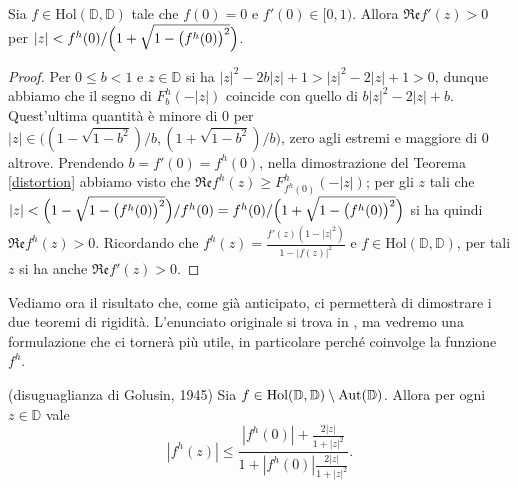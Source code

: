 \begin{cor} \label{distorto}
  Sia $f \in \text{Hol}(\mathbb{D},\mathbb{D})$ tale che $f(0)=0$ e $f'(0) \in [0,1)$. Allora $\mathfrak{Re}f'(z)>0$ per $|z|<f^h(0)/\Bigl(1+\sqrt{1-\bigl(f^h(0)\bigr)^2}\Bigr)$.
\end{cor}

\begin{proof}
  Per $0 \le b<1$ e $z \in \mathbb{D}$ si ha $|z|^2-2b|z|+1>|z|^2-2|z|+1>0$, dunque abbiamo che il segno di $F_b^h(-|z|)$ coincide con quello di $b|z|^2-2|z|+b$. Quest'ultima quantità è minore di $0$ per $|z| \in \bigl((1-\sqrt{1-b^2})/b, (1+\sqrt{1-b^2})/b\bigr)$, zero agli estremi e maggiore di $0$ altrove.
  Prendendo $b=f'(0)=f^h(0)$, nella dimostrazione del Teorema \ref{distortion} abbiamo visto che $\mathfrak{Re}f^h(z) \ge F_{f^h(0)}^h(-|z|)$; per gli $z$ tali che $|z|<\Bigl(1-\sqrt{1-\bigl(f^h(0)\bigr)^2}\Bigr)/f^h(0)=f^h(0)/\Bigl(1+\sqrt{1-\bigl(f^h(0)\bigr)^2}\Bigr)$ si ha quindi $\mathfrak{Re}f^h(z)>0$.
  Ricordando che $f^h(z)=\frac{f'(z)(1-|z|^2)}{1-|f(z)|^2}$ e $f \in \text{Hol}(\mathbb{D},\mathbb{D})$, per tali $z$ si ha anche $\mathfrak{Re}f'(z)>0$.
\end{proof}

Vediamo ora il risultato che, come già anticipato, ci permetterà di dimostrare i due teoremi di rigidità. L'enunciato originale si trova in \cite{GMG}, ma vedremo una formulazione che ci tornerà più utile, in particolare perché coinvolge la funzione $f^h$.

\begin{thm} \label{golusin}
  (disuguaglianza di Golusin, 1945) Sia $f \in \text{\normalfont{Hol}}(\mathbb{D},\mathbb{D})\setminus\text{\normalfont{Aut}}(\mathbb{D})$. Allora per ogni $z \in \mathbb{D}$ vale
  \begin{equation} \label{gol}
    |f^h(z)| \le \frac{|f^h(0)|+\frac{2|z|}{1+|z|^2}}{1+|f^h(0)|\frac{2|z|}{1+|z|^2}}.
  \end{equation}
\end{thm}

